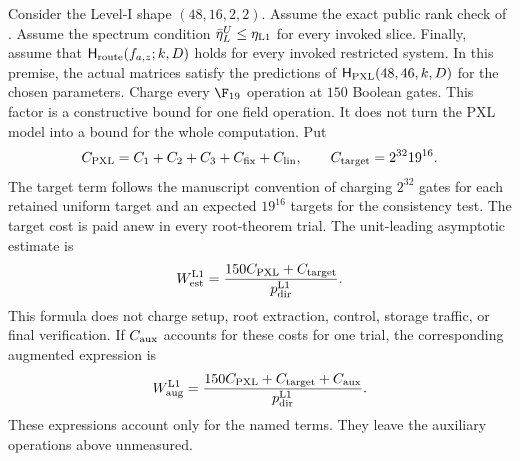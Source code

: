 \begin{theorem}
\label{thm:pxl-level1-recovery}
Consider the Level-I shape $(48,16,2,2)$.  Assume the exact public rank check
of .  Assume the spectrum condition
$\bar\eta_L^U\le\eta_{\rm L1}$ for every invoked slice.  Finally, assume
that $\mathsf H_{\rm route}(f_{a,z};k,D)$ holds for every invoked restricted
system.  In this premise, the actual matrices satisfy the predictions of
$\mathsf H_{\rm PXL}(48,46,k,D)$ for the chosen parameters.  Charge every
$\F_{19}$ operation at $150$ Boolean gates.  This factor is a constructive
bound for one field operation.  It does not turn the PXL model into a bound
for the whole computation.
Put
\begin{equation}
 C_{\rm PXL}=C_1+C_2+C_3+C_{\rm fix}+C_{\rm lin},
 \qquad
 C_{\rm target}=2^{32}19^{16}.
 \label{eq:pxl-kernel-cost}
\end{equation}
The target term follows the manuscript convention of charging $2^{32}$ gates
for each retained uniform target and an expected $19^{16}$ targets for the
consistency test.  The target cost is paid anew in every root-theorem trial.
The unit-leading asymptotic estimate is
\begin{equation}
 W_{\rm est}^{\rm L1}
 =\frac{150C_{\rm PXL}+C_{\rm target}}
        {p_{\rm dir}^{\rm L1}}.
 \label{eq:pxl-estimated-gates}
\end{equation}
This formula does not charge setup, root extraction, control, storage traffic,
or final verification.  If $C_{\rm aux}$ accounts for these costs for one
trial, the corresponding augmented expression is
\begin{equation}
 W_{\rm aug}^{\rm L1}
 =\frac{150C_{\rm PXL}+C_{\rm target}+C_{\rm aux}}
        {p_{\rm dir}^{\rm L1}}.
 \label{eq:pxl-total-gates}
\end{equation}
These expressions account only for the named terms.  They leave the auxiliary
operations above unmeasured.


\end{theorem}
